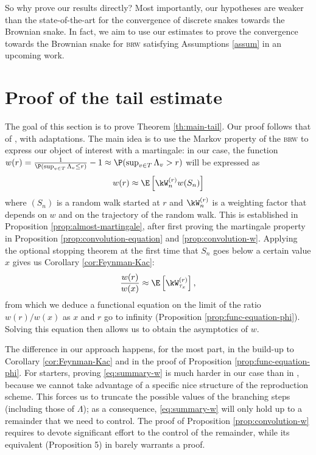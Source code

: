 \documentclass[10pt,a4paper]{article}
\newcommand{\todo}[1]{\textcolor{blue}{\textbf{TODO:} #1}}
\newcommand{\brw}{\textsc{brw}\xspace}
\newcommand{\repscheme}{reproduction scheme\xspace}
\begin{document}
So why prove our results directly? Most importantly, our hypotheses are weaker than the state-of-the-art for the convergence of discrete snakes towards the Brownian snake. In fact, we aim to use our estimates to prove the convergence towards the Brownian snake for \brw satisfying Assumptions \ref{assum} in an upcoming work. 















\section{Proof of the tail estimate}
\label{sec:main-proof}


The goal of this section is to prove Theorem \ref{th:main-tail}. Our proof follows that of \cite[Theorem 1]{lalley2015maximal}, with adaptations. The main idea is to use the Markov property of the \brw to express our object of interest with a martingale: in our case, the function $w(r) = \frac{1}{\P(\sup_{v\in T} \Lambda_v \leq r)}-1 \approx \P(\sup_{v\in T}\Lambda_v > r)$ will be expressed as
\begin{equation}\label{eq:summary-w}
w(r) \approx \E\left[ \kW^{(r)}_n w(S_n) \right] 
\end{equation}
where $(S_n)$ is a random walk started at $r$ and $\kW^{(r)}_n$ is a weighting factor that depends on $w$ and on the trajectory of the random walk. This is established in Proposition \ref{prop:almost-martingale}, after first proving the martingale property in Proposition \ref{prop:convolution-equation} and \ref{prop:convolution-w}. Applying the optional stopping theorem at the first time that $S_n$ goes below a certain value $x$ gives us Corollary \ref{cor:Feynman-Kac}:
\[ \frac{w(r)}{w(x)} \approx \E\left[ \kW^{(r)}_{\tau_x} \right] , \]
from which we deduce a functional equation on the limit of the ratio $w(r)/w(x)$ as $x$ and $r$ go to infinity (Proposition \ref{prop:func-equation-phi}). Solving this equation then allows us to obtain the asymptotics of $w$. 

The difference in our approach happens, for the most part, in the build-up to Corollary \ref{cor:Feynman-Kac} and in the proof of Proposition \ref{prop:func-equation-phi}. For starters, proving \eqref{eq:summary-w} is much harder in our case than in \cite{lalley2015maximal}, because we cannot take advantage of a specific nice structure of the \repscheme. This forces us to truncate the possible values of the branching steps (including those of $\Lambda$); as a consequence, \eqref{eq:summary-w} will only hold up to a remainder that we need to control. The proof of Proposition \ref{prop:convolution-w} requires to devote significant effort to the control of the remainder, while its equivalent (Proposition 5) in \cite{lalley2015maximal} barely warrants a proof.
\end{document}
